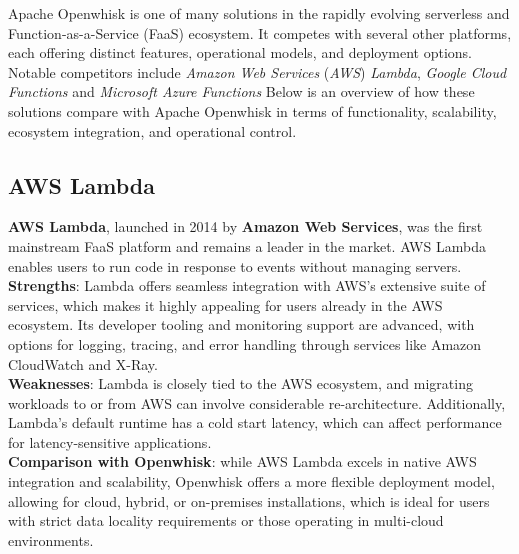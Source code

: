 Apache Openwhisk is one of many solutions in the rapidly evolving serverless and Function-as-a-Service (FaaS) ecosystem. It competes with several other platforms, each offering distinct features, operational models, and deployment options. Notable competitors include \textit{Amazon Web Services} (\textit{AWS}) \textit{Lambda}, \textit{Google Cloud Functions} and \textit{Microsoft Azure Functions} Below is an overview of how these solutions compare with Apache Openwhisk in terms of functionality, scalability, ecosystem integration, and operational control.
\subsection{AWS Lambda}
\textbf{AWS Lambda}, launched in 2014 by \textbf{Amazon Web Services}, was the first mainstream FaaS platform and remains a leader in the market. AWS Lambda enables users to run code in response to events without managing servers.\vspace{14pt}\\
\textbf{Strengths}: Lambda offers seamless integration with AWS’s extensive suite of services, which makes it highly appealing for users already in the AWS ecosystem. Its developer tooling and monitoring support are advanced, with options for logging, tracing, and error handling through services like Amazon CloudWatch and X-Ray.\vspace{14pt}\\
\textbf{Weaknesses}: Lambda is closely tied to the AWS ecosystem, and migrating workloads to or from AWS can involve considerable re-architecture. Additionally, Lambda’s default runtime has a cold start latency, which can affect performance for latency-sensitive applications.\vspace{14pt}\\
\textbf{Comparison with Openwhisk}: while AWS Lambda excels in native AWS integration and scalability, Openwhisk offers a more flexible deployment model, allowing for cloud, hybrid, or on-premises installations, which is ideal for users with strict data locality requirements or those operating in multi-cloud environments.

